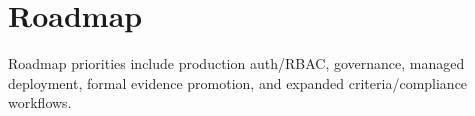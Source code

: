 \section{Roadmap}
Roadmap priorities include production auth/RBAC, governance, managed deployment, formal evidence promotion, and expanded criteria/compliance workflows.
